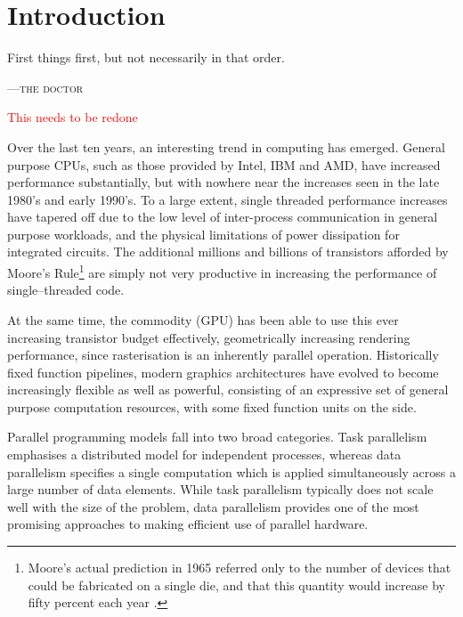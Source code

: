 
\chapter{Introduction}
\epigraph{First things first, but not necessarily in that order.}
{\textsc{---the doctor}}


\textcolor{red}{This needs to be redone}

Over the last ten years, an interesting trend in computing has emerged. General
purpose CPUs, such as those provided by Intel, IBM and AMD, have increased
performance substantially, but with nowhere near the increases seen in the late
1980's and early 1990's. To a large extent, single threaded performance
increases have tapered off due to the low level of inter-process communication
in general purpose workloads, and the physical limitations of power dissipation
for integrated circuits. The additional millions and billions of transistors
afforded by Moore's Rule\footnote{Moore's actual prediction in 1965 referred
only to the number of devices that could be fabricated on a single die, and that
this quantity would increase by fifty percent each year \cite{Moore:1965}.} are
simply not very productive in increasing the performance of single--threaded
code.

At the same time, the commodity  (GPU) has been
able to use this ever increasing transistor budget effectively, geometrically
increasing rendering performance, since rasterisation is an inherently parallel
operation. Historically fixed function pipelines, modern graphics architectures
have evolved to become increasingly flexible as well as powerful, consisting of
an expressive set of general purpose computation resources, with some fixed
function units on the side.

Parallel programming models fall into two broad categories. Task parallelism
emphasises a distributed model for independent processes, whereas data
parallelism specifies a single computation which is applied simultaneously
across a large number of data elements. While task parallelism typically does not
scale well with the size of the problem, data parallelism provides one of the
most promising approaches to making efficient use of parallel hardware.

